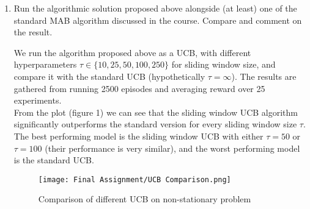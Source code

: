 \documentclass{article}
\begin{document}
\begin{enumerate}
\item{Run the algorithmic solution proposed above alongside (at least) one of the standard MAB algorithm discussed in the course. Compare and comment on the result.}

We run the algorithm proposed above as a UCB, with different hyperparameters $\tau \in \{10, 25, 50, 100, 250\}$ for sliding window size, and compare it with the standard UCB (hypothetically $\tau = \infty$). The results are gathered from running 2500 episodes and averaging reward over 25 experiments.
\\[10pt]
From the plot (figure 1) we can see that the sliding window UCB algorithm significantly outperforms the standard version for every sliding window size $\tau$. The best performing model is the sliding window UCB with either $\tau = 50$ or $\tau = 100$ (their performance is very similar), and the worst performing model is the standard UCB.
\\[1pt]
\begin{figure}[b!]
    \centering
    \texttt{[image: Final Assignment/UCB Comparison.png]}
    \caption{Comparison of different UCB on non-stationary problem}
\end{figure}

\end{enumerate}
\end{document}
